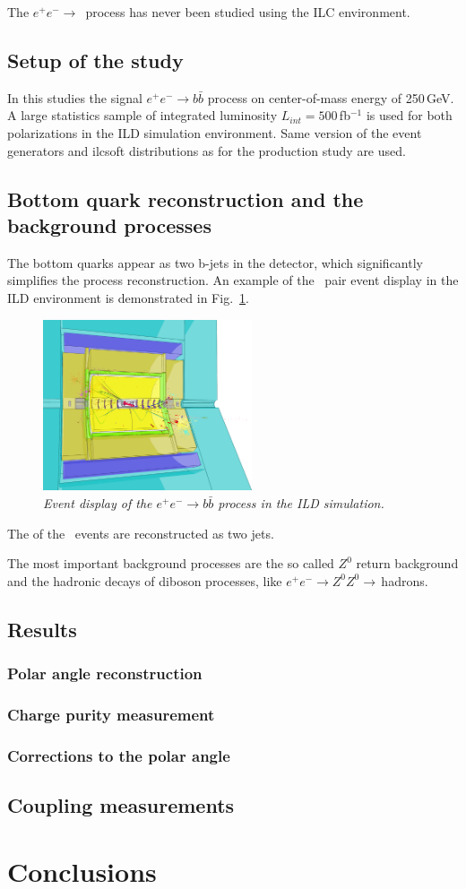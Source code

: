 The $e^+e^-\to$\bbbar\ process has never been studied using the ILC environment. 
\subsection{Setup of the study}
In this studies the signal $e^+e^-\to b\bar{b}$ process on center-of-mass energy of 250\,GeV. 
A large statistics sample of integrated luminosity $L_{int}= 500$\,fb{$^{-1}$} is used for both polarizations in the ILD simulation environment. 
Same version of the event generators and {\sc ilcsoft} distributions as for the \ttbar production study are used.


\subsection{Bottom quark reconstruction and the background processes}
The bottom quarks appear as two b-jets in the detector, which significantly simplifies the process reconstruction. 
An example of the \bbbar\ pair event display in the ILD environment is demonstrated in Fig.~\ref{fig:BottomEvent_3}. 
\begin{figure}[h]
	{\centering
		\includegraphics[width=0.55\textwidth]{ILD/graphics/ild-bbbar.png}
		\caption{\sl Event display of the $e^+e^-\to b\bar{b}$ process in the ILD simulation.
		}
		\label{fig:BottomEvent_3}
	}
	
\end{figure}

The  of the \bbbar\ events are reconstructed as two jets. 

The most important background processes are the so called $Z^0$ return background and the hadronic decays of diboson processes, like $e^+e^-\to Z^0Z^0\to$\,hadrons.



\subsection{Results}
\label{sec:BBBarresults}
\subsubsection{Polar angle reconstruction}
\subsubsection{Charge purity measurement}
\label{sec:ChargePurity}
\subsubsection{Corrections to the polar angle}
\subsection{Coupling measurements}
\section*{Conclusions}